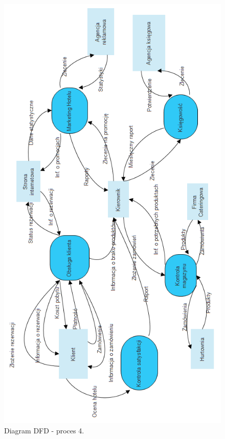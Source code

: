 \documentclass[a4paper, 11pt]{article}
\begin{document}
	\begin{figure}[H]%
			\center
			\includegraphics[scale=0.7]{Img/DFDpoziom0.png}
			\caption{Diagram DFD - proces 4.}
	\end{figure}
\end{document}
